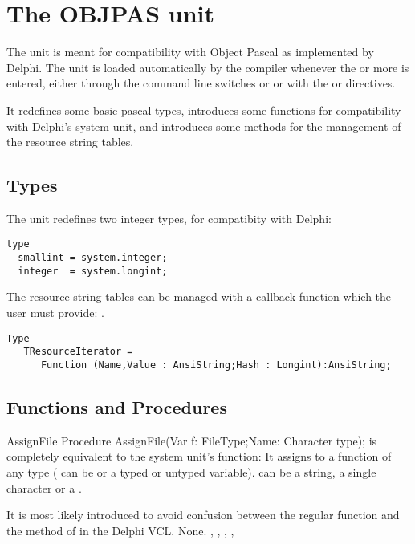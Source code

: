 \documentclass{report}
\begin{document}
\chapter{The OBJPAS unit}
The  unit is meant for compatibility with Object Pascal as
implemented by Delphi. The unit is loaded automatically by the \fpc compiler
whenever the  or  more is entered, either through
the command line switches  or  or with the  or  directives.

It redefines some basic pascal types, introduces some functions for
compatibility with Delphi's system unit, and introduces some methods for the
management of the resource string tables.

\section{Types}
The  unit redefines two integer types, for compatibity with
Delphi:
\begin{verbatim}
type
  smallint = system.integer;
  integer  = system.longint;
\end{verbatim}
The resource string tables can be managed with a callback function which the
user must provide: .
\begin{verbatim}
Type
   TResourceIterator = 
      Function (Name,Value : AnsiString;Hash : Longint):AnsiString;
\end{verbatim}

\section{Functions and Procedures}

\begin{procedure}{AssignFile}
\Declaration
Procedure AssignFile(Var f: FileType;Name: Character type);
\Description
{} is completely equivalent to the system unit's 
function: It assigns  to a function of any type (
can be  or a typed or untyped  variable).  can
be a string, a single character or a .

It is most likely introduced to avoid confusion between the regular 
 function and the  method of  
in the Delphi VCL.
\Errors
None.
\SeeAlso
{}, , , , 
\end{procedure}
\end{document}
